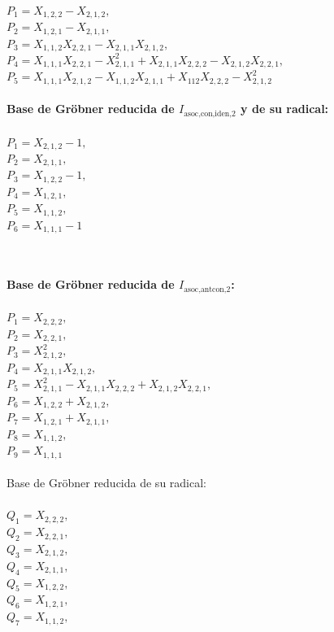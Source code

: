 \documentclass[10pt]{beamer}
\begin{document}
\begin{frame}
\\
$P_{1}=X_{1,2,2}-X_{2,1,2},$\\
$P_{2}=X_{1,2,1}-X_{2,1,1},$\\
$P_{3}=X_{1,1,2}X_{2,2,1}-X_{2,1,1}X_{2,1,2},$\\
$P_{4}=X_{1,1,1}X_{2,2,1}-X_{2,1,1}^2+X_{2,1,1}X_{2,2,2}-X_{2,1,2}X_{2,2,1},$\\
$P_{5}=X_{1,1,1}X_{2,1,2}-X_{1,1,2}X_{2,1,1}+X_{112}X_{2,2,2}-X_{2,1,2}^2$\\
\\
\textbf{Base de Gr\"obner reducida de $I_{\text{asoc,con,iden,}2}$ y de su radical:}\\
\\
$P_{1}= X_{2,1,2}-1,$\\
$P_{2}= X_{2,1,1},$\\
$P_{3}= X_{1,2,2}-1,$\\
$P_{4}= X_{1,2,1},$\\
$P_{5}= X_{1,1,2},$\\
$P_{6}= X_{1,1,1}-1$\\
\\
\end{frame}
\\
\textbf{Base de Gr\"obner reducida de $I_{\text{asoc,antcon,}2}$:}\\
\\
$P_{1}=X_{2,2,2},$\\
$P_{2}=X_{2,2,1},$\\
$P_{3}=X_{2,1,2}^2,$\\
$P_{4}=X_{2,1,1}X_{2,1,2},$\\
$P_{5}=X_{2,1,1}^2-X_{2,1,1}X_{2,2,2}+X_{2,1,2}X_{2,2,1},$\\
$P_{6}=X_{1,2,2}+X_{2,1,2},$\\
$P_{7}=X_{1,2,1}+X_{2,1,1},$\\
$P_{8}=X_{1,1,2},$\\
$P_{9}=X_{1,1,1}$\\
\\
Base de Gr\"obner reducida de su radical:\\
\\
$Q_{1}=X_{2,2,2},$\\
$Q_{2}=X_{2,2,1},$\\
$Q_{3}=X_{2,1,2},$\\
$Q_{4}=X_{2,1,1},$\\
$Q_{5}=X_{1,2,2},$\\
$Q_{6}=X_{1,2,1},$\\
$Q_{7}=X_{1,1,2},$\\
\end{document}
